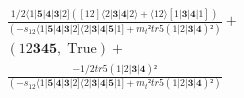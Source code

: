 \documentclass[varwidth, border=5pt]{standalone}
\begin{document}
\begin{my}
$\begin{gathered}
\scriptscriptstyle\frac{1/2⟨1|𝟓|𝟒|𝟑|2]([12]⟨2|𝟑|𝟒|2⟩+⟨12⟩[1|𝟑|𝟒|1])}{(-s_{12}⟨1|𝟓|𝟒|𝟑|2]⟨2|𝟑|𝟒|𝟓|1]+m_t²tr5(1|2|𝟑|𝟒)²)} +\\
\scriptscriptstyle(12𝟑𝟒𝟓,\;\text{True}) +\\
\scriptscriptstyle\frac{-1/2tr5(1|2|𝟑|𝟒)²}{(-s_{12}⟨1|𝟓|𝟒|𝟑|2]⟨2|𝟑|𝟒|𝟓|1]+m_t²tr5(1|2|𝟑|𝟒)²)} \phantom{+}
\end{gathered}$
\end{my}
\end{document}
